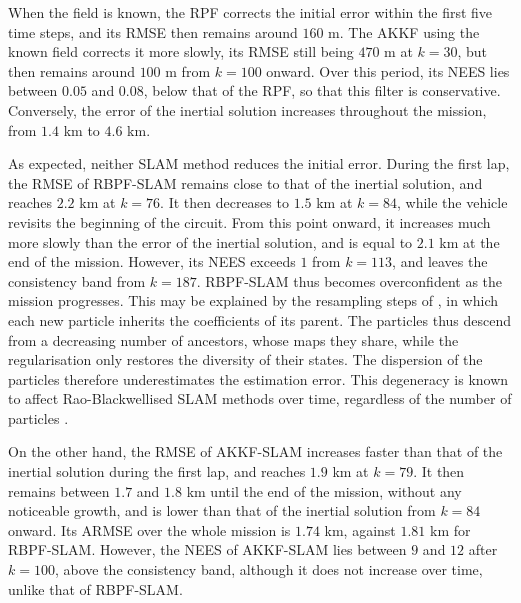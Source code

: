 \begin{table}[!htb]
	\centering
	\caption{Estimation ARMSE, NEES over the last third of the mission, field ARMSE along the trajectory, computational cost per run, in flops, and memory requirement of RBPF-SLAM and AKKF-SLAM for several ranks of their bases.}\label{tab:SLAM_ranks}
\end{table}

When the field is known, the RPF corrects the initial error within the first five time steps, and its RMSE then remains around $160$ m. The AKKF using the known field corrects it more slowly, its RMSE still being $470$ m at $k=30$, but then remains around $100$ m from $k=100$ onward. Over this period, its NEES lies between $0.05$ and $0.08$, below that of the RPF, so that this filter is conservative. Conversely, the error of the inertial solution increases throughout the mission, from $1.4$ km to $4.6$ km.

As expected, neither SLAM method reduces the initial error. During the first lap, the RMSE of RBPF-SLAM remains close to that of the inertial solution, and reaches $2.2$ km at $k=76$. It then decreases to $1.5$ km at $k=84$, while the vehicle revisits the beginning of the circuit. From this point onward, it increases much more slowly than the error of the inertial solution, and is equal to $2.1$ km at the end of the mission. However, its NEES exceeds $1$ from $k=113$, and leaves the consistency band from $k=187$. RBPF-SLAM thus becomes overconfident as the mission progresses. This may be explained by the resampling steps of , in which each new particle inherits the coefficients of its parent. The particles thus descend from a decreasing number of ancestors, whose maps they share, while the regularisation only restores the diversity of their states. The dispersion of the particles therefore underestimates the estimation error. This degeneracy is known to affect Rao-Blackwellised SLAM methods over time, regardless of the number of particles \cite{bib:RBPF-SLAM-consistency}.

On the other hand, the RMSE of AKKF-SLAM increases faster than that of the inertial solution during the first lap, and reaches $1.9$ km at $k=79$. It then remains between $1.7$ and $1.8$ km until the end of the mission, without any noticeable growth, and is lower than that of the inertial solution from $k=84$ onward. Its ARMSE over the whole mission is $1.74$ km, against $1.81$ km for RBPF-SLAM. However, the NEES of AKKF-SLAM lies between $9$ and $12$ after $k=100$, above the consistency band, although it does not increase over time, unlike that of RBPF-SLAM.

